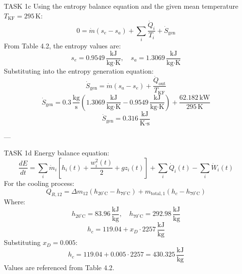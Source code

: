 TASK 1c  
Using the entropy balance equation and the given mean temperature \( T_{\text{KF}} = 295 \, \text{K} \):  
\[
0 = \dot{m}(s_e - s_a) + \sum_i \frac{\dot{Q}_i}{T_i} + \dot{S}_{\text{gen}}
\]  
From Table 4.2, the entropy values are:  
\[
s_e = 0.9549 \, \frac{\text{kJ}}{\text{kg·K}}, \quad s_a = 1.3069 \, \frac{\text{kJ}}{\text{kg·K}}
\]  
Substituting into the entropy generation equation:  
\[
\dot{S}_{\text{gen}} = \dot{m}(s_a - s_e) + \frac{\dot{Q}_{\text{out}}}{T_{\text{KF}}}
\]  
\[
\dot{S}_{\text{gen}} = 0.3 \, \frac{\text{kg}}{\text{s}} \left( 1.3069 \, \frac{\text{kJ}}{\text{kg·K}} - 0.9549 \, \frac{\text{kJ}}{\text{kg·K}} \right) + \frac{62.182 \, \text{kW}}{295 \, \text{K}}
\]  
\[
\dot{S}_{\text{gen}} = 0.316 \, \frac{\text{kJ}}{\text{K·s}}
\]  

---

TASK 1d  
Energy balance equation:  
\[
\frac{dE}{dt} = \sum_i \dot{m}_i \left[ h_i(t) + \frac{w_i^2(t)}{2} + g z_i(t) \right] + \sum_i \dot{Q}_i(t) - \sum_i \dot{W}_i(t)
\]  
For the cooling process:  
\[
Q_{R,12} = \Delta m_{12} \left( h_{20^\circ\text{C}} - h_{70^\circ\text{C}} \right) + m_{\text{total},1} \left( h_c - h_{70^\circ\text{C}} \right)
\]  
Where:  
\[
h_{20^\circ\text{C}} = 83.96 \, \frac{\text{kJ}}{\text{kg}}, \quad h_{70^\circ\text{C}} = 292.98 \, \frac{\text{kJ}}{\text{kg}}
\]  
\[
h_c = 119.04 + x_D \cdot 2257 \, \frac{\text{kJ}}{\text{kg}}
\]  
Substituting \( x_D = 0.005 \):  
\[
h_c = 119.04 + 0.005 \cdot 2257 = 430.325 \, \frac{\text{kJ}}{\text{kg}}
\]  
Values are referenced from Table 4.2.